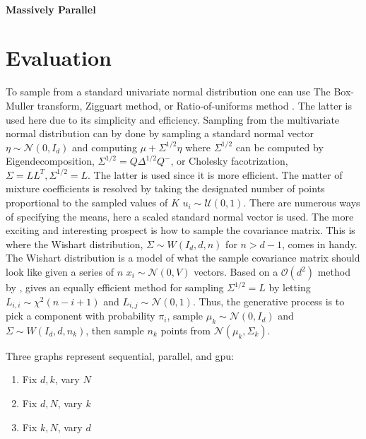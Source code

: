 \documentclass{article}
\newcommand{\boundedBy}[1]{\mathcal{O} \left ( #1 \right )}
\begin{document}
\paragraph{Massively Parallel}

\section{Evaluation}

To sample from a standard univariate normal distribution one can use The Box-Muller transform, Zigguart method, or Ratio-of-uniforms method \cite{kinderman1977computer}. The latter is used here due to its simplicity and efficiency. Sampling from the multivariate normal distribution can by done by sampling a standard normal vector $\eta \sim \mathcal{N}(0 ,I_d)$ and computing $\mu + \Sigma^{1/2} \eta$ where $\Sigma^{1/2}$ can be computed by Eigendecomposition, $\Sigma^{1/2} = Q \Delta^{1/2} Q^{-}$, or Cholesky facotrization, $\Sigma = L L^T, \Sigma^{1/2} = L$. The latter is used since it is more efficient. The matter of mixture coefficients is resolved by taking the designated number of points proportional to the sampled values of $K$ $u_i \sim \mathcal{U}(0, 1)$. There are numerous ways of specifying the means, here a scaled standard normal vector is used. The more exciting and interesting prospect is how to sample the covariance matrix. This is where the Wishart distribution, $\Sigma \sim W(I_d, d, n)$ for $n > d - 1$, comes in handy. The Wishart distribution is a model of what the sample covariance matrix should look like given a series of $n$ $x_i \sim \mathcal{N}(0, V)$ vectors. Based on a $\boundedBy{d^2}$ method by \cite{odell1966numerical}, \cite{sawyer2007wishart} gives an equally efficient method for sampling $\Sigma^{1/2} = L$ by letting $L_{i,i} \sim \chi^2(n - i + 1)$ and $L_{i,j} \sim \mathcal{N}(0, 1)$. Thus, the generative process is to pick a component with probability $\pi_i$, sample $\mu_k \sim \mathcal{N}(0, I_d)$ and $\Sigma \sim W(I_d, d, n_k)$, then sample $n_k$ points from $\mathcal{N}(\mu_k, \Sigma_k)$.


Three graphs represent sequential, parallel, and gpu:

\begin{enumerate}
	\item Fix $d, k$, vary $N$
	\item Fix $d, N$, vary $k$
	\item Fix $k, N$, vary $d$
\end{enumerate}
\end{document}
